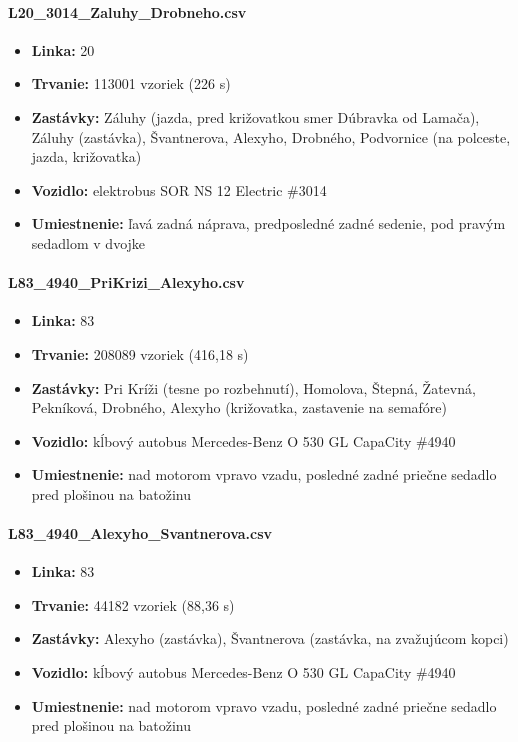 \paragraph{L20\_3014\_Zaluhy\_Drobneho.csv}
	\begin{itemize}[noitemsep, topsep=0pt]
  	\item \textbf{Linka:} 20
  	\item \textbf{Trvanie:} 113001 vzoriek (226 s)
  	\item \textbf{Zastávky:} Záluhy (jazda, pred križovatkou smer Dúbravka od Lamača), Záluhy (zastávka), Švantnerova, Alexyho, Drobného, Podvornice (na polceste, jazda, križovatka)
  	\item \textbf{Vozidlo:} elektrobus SOR NS 12 Electric \#3014
  	\item \textbf{Umiestnenie:} ľavá zadná náprava, predposledné zadné sedenie, pod pravým sedadlom v dvojke
  	\end{itemize}
  
\paragraph{L83\_4940\_PriKrizi\_Alexyho.csv}
	\begin{itemize}[noitemsep, topsep=0pt]
  	\item \textbf{Linka:} 83
  	\item \textbf{Trvanie:} 208089 vzoriek (416,18 s)
  	\item \textbf{Zastávky:} Pri Kríži (tesne po rozbehnutí), Homolova, Štepná, Žatevná, Pekníková, Drobného, Alexyho (križovatka, zastavenie na semafóre)
  	\item \textbf{Vozidlo:} kĺbový autobus Mercedes-Benz O 530 GL CapaCity \#4940
  	\item \textbf{Umiestnenie:} nad motorom vpravo vzadu, posledné zadné priečne sedadlo pred plošinou na batožinu
  	\end{itemize}
  
\paragraph{L83\_4940\_Alexyho\_Svantnerova.csv}
	\begin{itemize}[noitemsep, topsep=0pt]
  	\item \textbf{Linka:} 83
  	\item \textbf{Trvanie:} 44182 vzoriek (88,36 s)
  	\item \textbf{Zastávky:} Alexyho (zastávka), Švantnerova (zastávka, na zvažujúcom kopci)
  	\item \textbf{Vozidlo:} kĺbový autobus Mercedes-Benz O 530 GL CapaCity \#4940
  	\item \textbf{Umiestnenie:} nad motorom vpravo vzadu, posledné zadné priečne sedadlo pred plošinou na batožinu
  	\end{itemize}

